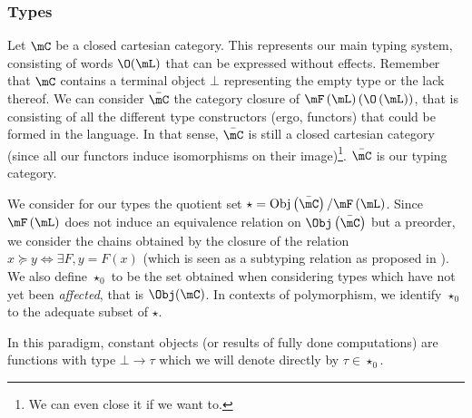 \documentclass[math, english, info]{cours}
\begin{document}
\subsubsection{Types}\label{subsubsec:types}
Let $\mC$ be a closed cartesian category. This represents our main typing system, consisting of words $\O(\mL)$ that can be expressed without effects.
Remember that $\mC$ contains a terminal object $\bot$ representing the empty type or the lack thereof.
We can consider $\bar{\mC}$ the category closure of $\mF\left( \mL \right)\left(\O\left( \mL \right)\right)$, that is consisting of all the different type constructors (ergo, functors) that could be formed in the language.
In that sense, $\bar{\mC}$ is still a closed cartesian category (since all our functors induce isomorphisms on their image)\footnote{We can even close it if we want to.}.
$\bar{\mC}$ is our typing category.

We consider for our types the quotient set $\star = \mathrm{Obj}\left( \bar{\mC} \right)/\mF\left( \mL \right)$.
Since $\mF\left( \mL \right)$ does not induce an equivalence relation on $\Obj\left( \bar{\mC} \right)$ but a preorder, we consider the chains obtained by the closure of the relation $x\succeq y \Leftrightarrow \exists F, y = F(x)$ (which is seen as a subtyping relation as proposed in ).
We also define $\star_{0}$ to be the set obtained when considering types which have not yet been \emph{affected}, that is $\Obj(\mC)$.
In contexts of polymorphism, we identify $\star_{0}$ to the adequate subset of $\star$.

In this paradigm, constant objects (or results of fully done computations) are functions with type $\bot \to \tau$ which we will denote directly by $\tau \in \star_{0}$.
\end{document}
